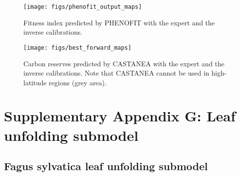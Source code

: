 \documentclass[11pt,]{article}
\begin{document}
\setcounter{figure}{0}
\setcounter{table}{0}

\renewcommand*{\thepage}{F--\arabic{page}}

\hfill \break

\begin{figure}[H]

{\centering \texttt{[image: figs/phenofit\_output\_maps]} 

}

\caption{Fitness index predicted by PHENOFIT with the expert and the inverse calibrations.}\label{fig:phenofit_output_maps}
\end{figure}

\begin{figure}[H]

{\centering \texttt{[image: figs/best\_forward\_maps]} 

}

\caption{Carbon reserves predicted by CASTANEA with the expert and the inverse calibrations. Note that CASTANEA cannot be used in high-latitude regions (grey area).}\label{fig:best_forward_maps}
\end{figure}

\newpage

\hypertarget{appendixG}{%
\section{Supplementary Appendix G: Leaf unfolding
submodel}\label{appendixG}}

\renewcommand*\thetable{G.\arabic{table}}
\renewcommand*\thefigure{G.\arabic{figure}}

\setcounter{figure}{0}
\setcounter{table}{0}

\renewcommand*{\thepage}{G--\arabic{page}}

\hfill \break

\hypertarget{fagus-sylvatica-leaf-unfolding-submodel}{%
\subsection{Fagus sylvatica leaf unfolding
submodel}\label{fagus-sylvatica-leaf-unfolding-submodel}}
\end{document}
